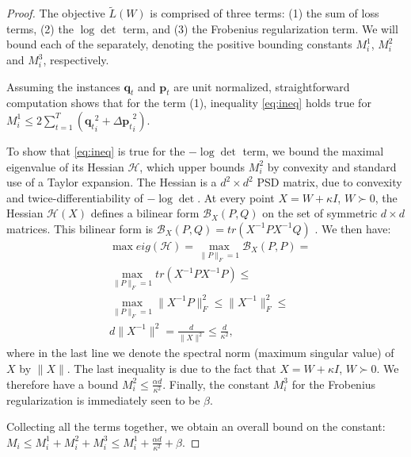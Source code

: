 \documentclass[twoside,11pt]{article}
\newcommand\mat[1]{{#1}}
\renewcommand\vec[1]{\mathbf{#1}}
\newcommand{\W}{\mat{W}}
\newcommand{\tL}{\tilde{L}(\W)}
\newcommand{\q}{{\vec{q}}}
\newcommand{\p}{{\vec{p}}}
\newcommand{\trip}{{t}}
\newcommand{\qt}{{\q_{\trip}}}
\newcommand{\pt}{{\p_{\trip}}}
\begin{document}
\begin{proof}%
    The objective $\tL$ is comprised of three terms: (1) the sum of loss terms, (2) the $\log \det$ term, and (3) the Frobenius regularization term. We will bound each of the separately, denoting the positive bounding constants $M^1_i$, $M^2_i$ and $M^3_i$, respectively. 

    Assuming the instances $\qt$ and $\pt$ are unit normalized, straightforward computation shows that for the term (1), inequality \ref{eq:ineq} holds true for $M^1_i \leq 2 \sum_{t=1}^T (\qt_i^2 +{\Delta\vec{p}_{t}}_i^2)$. %

    To show that \ref{eq:ineq} is true for the $-\log \det$ term, we bound the maximal eigenvalue of its Hessian $\mathcal{H}$, which upper bounds $M_i^2$ by convexity and standard use of a Taylor expansion.
    The Hessian is a $d^2 \times d^2$ PSD matrix, due to convexity and twice-differentiability of $- \log \det$. At every point $\mat{X} = \W + \kappa I$, $\W \succ 0$, the Hessian $\mathcal{H}(\mat{X})$ defines a bilinear form $\mathcal{B}_{\mat{X}}\left(\mat{P},\mat{Q}\right)$ on the set of symmetric $d \times d$ matrices. This bilinear form is $\mathcal{B}_{\mat{X}}\left(\mat{P},\mat{Q}\right) = tr\left(\mat{X}^{-1}\mat{P} \mat{X}^{-1}\mat{Q}\right)$ \citep[Appendix A]{boyd2004convex}. We then have:
    \begin{align*}
        &\max eig(\mathcal{H}) = \max_{\|\mat{P}\|_F=1} \mathcal{B}_{\mat{X}}\left(\mat{P},\mat{P}\right) = \\
        &\max_{\|\mat{P}\|_F=1} tr\left(\mat{X}^{-1}\mat{P} \mat{X}^{-1}\mat{P}\right) \leq \\
        &\max_{\|\mat{P}\|_F=1} \|\mat{X}^{-1} \mat{P}\|_F^2 \leq \|\mat{X}^{-1}\|_F^2 \leq  \\
        & d \|\mat{X}^{-1}\|^2 = \frac{d}{\|\mat{X}\|^2} \leq \frac{d}{\kappa^2},
    \end{align*}
    where in the last line we denote the spectral norm (maximum singular value) of $\mat{X}$ by $\|\mat{X}\|$. The last inequality is due to the fact that $\mat{X} = \W + \kappa I$, $\W \succ 0$. We therefore have a bound $M^2_i \leq \frac{\alpha d}{\kappa^2}$.
    Finally, the constant $M^3_{i}$ for the Frobenius regularization is immediately seen to be $\beta$.

    Collecting all the terms together, we obtain an overall bound on the constant: $M_i \leq M^1_{i} + M^2_{i} + M^3_{i} \leq  M^1_{i} + \frac{\alpha d}{\kappa ^2} + \beta$.
\end{proof}
\end{document}
